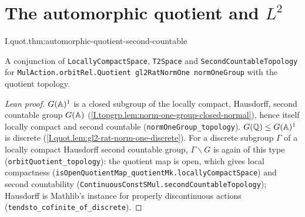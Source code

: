 \section{\texorpdfstring{The automorphic quotient and $L^2$}{The automorphic quotient and L2}}

\begin{theorem}
\end{theorem}
\begin{tfformal}{I.quot.thm:automorphic-quotient-second-countable}
\begin{tffidelity}
A conjunction of \texttt{LocallyCompactSpace}, \texttt{T2Space} and \texttt{SecondCountableTopology} for \texttt{MulAction.orbitRel.Quotient gl2RatNormOne normOneGroup} with the quotient topology.
\end{tffidelity}
\end{tfformal}
\begin{proof}[Lean proof]
$G(\mathbb{A})^1$ is a closed subgroup of the locally compact, Hausdorff, second countable group $G(\mathbb{A})$ (\cref{I.topgrp.lem:norm-one-group-closed-normal}), hence itself locally compact and second countable (\texttt{normOneGroup\_topology}). $G(\mathbb{Q})\le G(\mathbb{A})^1$ is discrete (\cref{I.quot.lem:gl2-rat-norm-one-discrete}). For a discrete subgroup $\Gamma$ of a locally compact Hausdorff second countable group, $\Gamma\backslash G$ is again of this type (\texttt{orbitQuotient\_topology}): the quotient map is open, which gives local compactness (\texttt{isOpenQuotientMap\_quotientMk.locallyCompactSpace}) and second countability (\texttt{ContinuousConstSMul.secondCountableTopology}); Hausdorff is Mathlib's instance for properly discontinuous actions (\texttt{tendsto\_cofinite\_of\_discrete}).
\end{proof}

